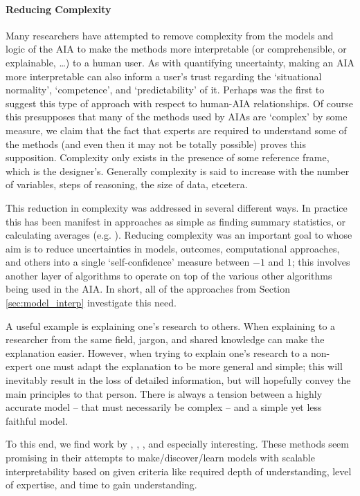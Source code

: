     \paragraph{Reducing Complexity} Many researchers have attempted to remove complexity from the models and logic of the AIA to make the methods more interpretable (or comprehensible, or explainable, \ldots) to a human user. As with quantifying uncertainty, making an AIA more interpretable can also inform a user's trust regarding the `situational normality', `competence', and `predictability' of it. Perhaps \cite{Sheridan1984-kx} was the first to suggest this type of approach with respect to human-AIA relationships. Of course this presupposes that many of the methods used by AIAs are `complex' by some measure, we claim that the fact that experts are required to understand some of the methods (and even then it may not be totally possible) proves this supposition. Complexity only exists in the presence of some reference frame, which is the designer's. Generally complexity is said to increase with the number of variables, steps of reasoning, the size of data, etcetera.

    This reduction in complexity was addressed in several different ways. In practice this has been manifest in approaches as simple as finding summary statistics, or calculating averages (e.g. \cite{Muir1994-ow,Muir1996-gt}). Reducing complexity was an important goal to \cite{Aitken2016-fb} whose aim is to reduce uncertainties in models, outcomes, computational approaches, and others into a single `self-confidence' measure between $-1$ and $1$; this involves another layer of algorithms to operate on top of the various other algorithms being used in the AIA. In short, all of the approaches from Section \ref{sec:model_interp} investigate this need.

    A useful example is explaining one's research to others. When explaining to a researcher from the same field, jargon, and shared knowledge can make the explanation easier. However, when trying to explain one's research to a non-expert one must adapt the explanation to be more general and simple; this will inevitably result in the loss of detailed information, but will hopefully convey the main principles to that person. There is always a tension between a highly accurate model -- that must necessarily be complex -- and a simple yet less faithful model. 

    To this end, we find work by \cite{Ruping2006-xj}, \cite{Van_Belle2012-dt}, \cite{Ribeiro2016-uc}, and \cite{Choi2016-by} especially interesting. These methods seem promising in their attempts to make/discover/learn models with scalable interpretability based on given criteria like required depth of understanding, level of expertise, and time to gain understanding. 
    
